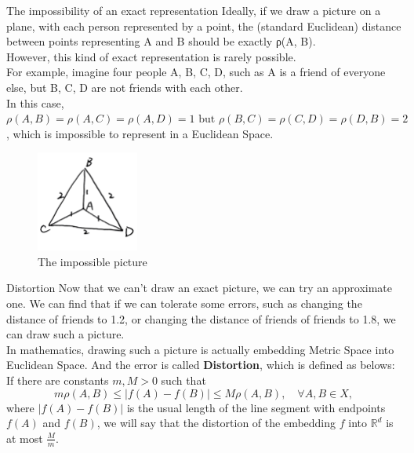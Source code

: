 \documentclass[xcolor=dvipsnames]{beamer}
\theoremstyle{remark}
\begin{document}
\begin{frame}{The impossibility of an exact representation}
  \hspace*{1em}Ideally, if we draw a picture on a plane, with each person represented by a point, the (standard Euclidean) distance between points representing A and B should be exactly ρ(A, B).\\
  \hspace*{1em}However, this kind of exact representation is rarely possible.\\
  \hspace*{1em}For example, imagine four people A, B, C, D, such as A is a friend of everyone else, but B, C, D are not friends with each other.\\
  \hspace*{1em}In this case, $\rho(A, B) = \rho(A, C) = \rho(A, D) = 1 \text{ but } \rho(B, C) = \rho(C, D) = \rho(D, B) = 2$, which is impossible to represent in a Euclidean Space.\\
  \begin{figure}[H] %
    \centering       %
    \includegraphics[width=0.3\textwidth]{fig3.jpg} %
    \caption{The impossible picture} %
    \label{Fig3}   %
\end{figure}
\end{frame}

\begin{frame}{Distortion}
  \hspace*{1em}Now that we can't draw an exact picture, we can try an approximate one. We can find that if we can tolerate some errors, such as changing the distance of friends to 1.2, or changing the distance of friends of friends to 1.8, we can draw such a picture.\\
  \hspace*{1em}In mathematics, drawing such a picture is actually embedding Metric Space into Euclidean Space. And the error is called \textbf{Distortion}, which is defined as belows: \\
  \hspace*{1em}If there are constants \( m, M > 0 \) such that
  \[
  m \rho(A, B) \leq | f(A) - f(B) | \leq M \rho(A, B), \quad \forall A, B \in X,
  \]
  where \( | f(A) - f(B) | \) is the usual length of the line segment with endpoints \( f(A) \) and \( f(B) \), we will say that the distortion of the embedding \( f \) into \( \mathbb{R}^d \) is at most \( \frac{M}{m} \).\\
\end{frame}
\end{document}
